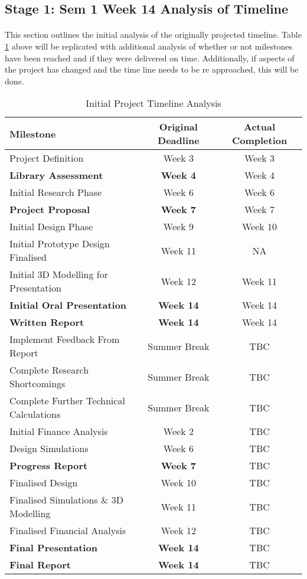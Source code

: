 \newpage

\subsection{Stage 1: Sem 1 Week 14 Analysis of Timeline}

\paragraph{}
This section outlines the initial analysis of the originally projected timeline. Table \ref{table:milestones_2} above will be replicated with additional analysis of whether or not milestones have been reached and if they were delivered on time. Additionally, if aspects of the project has changed and the time line needs to be re approached, this will be done.  

\begin{table}[H]
\centering
\begin{tabular}{||p{5cm} c c||} 
 \hline
 \textbf{Milestone} & \textbf{Original Deadline} & \textbf{Actual Completion} \\ [0.5ex] 
 \hline\hline
 Project Definition 						& Week 3 & Week 3\\ 
 \textbf{Library Assessment} 				& \textbf{Week 4} & Week 4\\
 Initial Research Phase 					& Week 6 & Week 6\\
 \textbf{Project Proposal} 					& \textbf{Week 7} & Week 7\\
 Initial Design Phase & Week 9				& Week 10\\
 Initial Prototype Design Finalised 		& Week 11 & NA\\
 Initial 3D Modelling for Presentation 		& Week 12 & Week 11\\ 
 \textbf{Initial Oral Presentation} 		& \textbf{Week 14} & Week 14\\
 \textbf{Written Report} 					& \textbf{Week 14} & Week 14\\ 
 Implement Feedback From Report 			& Summer Break & TBC \\
 Complete Research Shortcomings 			& Summer Break & TBC \\
 Complete Further Technical Calculations 	& Summer Break & TBC \\
 Initial Finance Analysis 					& Week 2 & TBC \\
 Design Simulations 						& Week 6 & TBC \\ 
 \textbf{Progress Report} 					& \textbf{Week 7} & TBC \\
 Finalised Design 							& Week 10 & TBC \\
 Finalised Simulations \& 3D Modelling 		& Week 11 & TBC \\
 Finalised Financial Analysis 				& Week 12 & TBC \\ 
 \textbf{Final Presentation} 				& \textbf{Week 14} & TBC\\
 \textbf{Final Report} 						& \textbf{Week 14} & TBC\\ [1ex] 
 \hline
\end{tabular}
\caption{Initial Project Timeline Analysis}
\label{table:milestones_2}
\end{table}      

